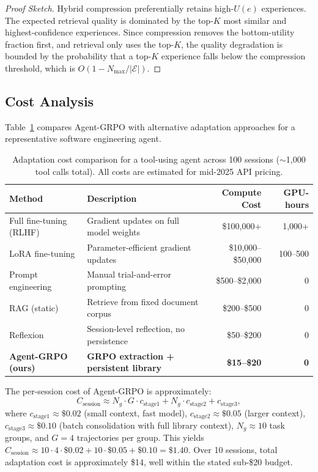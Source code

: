\documentclass[11pt]{article}
\begin{document}
\begin{proof}[Proof Sketch]
Hybrid compression preferentially retains high-$U(e)$ experiences. The
expected retrieval quality is dominated by the top-$K$ most similar and
highest-confidence experiences. Since compression removes the bottom-utility
fraction first, and retrieval only uses the top-$K$, the quality degradation
is bounded by the probability that a top-$K$ experience falls below the
compression threshold, which is $O(1 - N_{\max}/|\mathcal{E}|)$.
\end{proof}

\subsection{Cost Analysis}

Table~\ref{tab:cost} compares Agent-GRPO with alternative adaptation
approaches for a representative software engineering agent.

\begin{table}[H]
\centering
\caption{Adaptation cost comparison for a tool-using agent across 100 sessions
($\sim$1,000 tool calls total). All costs are estimated for mid-2025 API pricing.}
\label{tab:cost}
\begin{tabularx}{\textwidth}{lXrr}
\toprule
\textbf{Method} & \textbf{Description} & \textbf{Compute Cost} & \textbf{GPU-hours} \\
\midrule
Full fine-tuning (RLHF)   & Gradient updates on full model weights & \$100,000+ & 1,000+ \\
LoRA fine-tuning           & Parameter-efficient gradient updates     & \$10,000--\$50,000 & 100--500 \\
Prompt engineering         & Manual trial-and-error prompting         & \$500--\$2,000 & 0 \\
RAG (static)               & Retrieve from fixed document corpus      & \$200--\$500 & 0 \\
Reflexion~\cite{shinn2023reflexion} & Session-level reflection, no persistence & \$50--\$200 & 0 \\
\textbf{Agent-GRPO (ours)} & \textbf{GRPO extraction + persistent library} & \textbf{\$15--\$20} & \textbf{0} \\
\bottomrule
\end{tabularx}
\end{table}

The per-session cost of Agent-GRPO is approximately:
\begin{equation}
    C_{\text{session}} \approx N_g \cdot G \cdot c_{\text{stage1}} + N_g \cdot c_{\text{stage2}} + c_{\text{stage3}},
    \label{eq:cost}
\end{equation}
where $c_{\text{stage1}} \approx \$0.02$ (small context, fast model),
$c_{\text{stage2}} \approx \$0.05$ (larger context), $c_{\text{stage3}} \approx \$0.10$
(batch consolidation with full library context), $N_g \approx 10$ task groups,
and $G = 4$ trajectories per group. This yields
$C_{\text{session}} \approx 10 \cdot 4 \cdot \$0.02 + 10 \cdot \$0.05 + \$0.10 = \$1.40$.
Over 10 sessions, total adaptation cost is approximately \$14, well within
the stated sub-\$20 budget.
\end{document}
